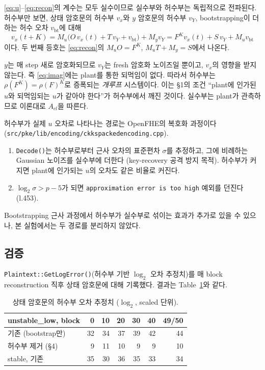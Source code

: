 \documentclass[11pt,a4paper]{article}
\begin{document}
\eqref{eq:u}--\eqref{eq:recon}의 계수는 모두 실수이므로 실수부와 허수부는 독립적으로 전파된다.
허수부만 보면, 상태 암호문의 허수부 $v_x$와 $y$ 암호문의 허수부 $v_Y$, bootstrapping이 더하는 허수 오차 $v_{\mathrm{bt}}$에 대해
\begin{equation}
v_x(t+K)=M_u\bigl(O\,v_x(t)+T\,v_Y+v_{\mathrm{bt}}\bigr)+M_y v_Y
        = F^K v_x(t)+S\,v_Y+M_u v_{\mathrm{bt}}
\label{eq:imag}
\end{equation}
이다. 두 번째 등호는 \eqref{eq:recon}의 $M_uO=F^K$, $M_uT+M_y=S$에서 나온다.

$y$는 매 step 새로 암호화되므로 $v_Y$는 fresh 암호화 노이즈일 뿐이고, $v_x$의 영향을 받지 않는다.
즉 \eqref{eq:imag}에는 plant를 통한 되먹임이 없다.
따라서 허수부는 $\rho(F^K)=\rho(F)^K$로 증폭되는 \emph{개루프} 시스템이다.
이는 \S1의 조건 ``plant에 인가된 $u$와 되먹임되는 $u$가 같아야 한다''가 허수부에서 깨진 것이다.
실수부는 plant가 관측하므로 이론대로 $A_{cl}$을 따른다.

허수부가 실제 $u$ 오차로 나타나는 경로는 OpenFHE의 복호화 과정이다
(\texttt{src/pke/lib/encoding/ckkspackedencoding.cpp}).
\begin{enumerate}
\item \texttt{Decode()}는 허수부로부터 근사 오차의 표준편차 $\sigma$를 추정하고, 그에 비례하는 Gaussian 노이즈를 실수부에 더한다 (key-recovery 공격 방지 목적).
      허수부가 커지면 plant에 인가되는 $u$의 오차도 같은 비율로 커진다.
\item $\log_2\sigma>p-5$가 되면 \texttt{approximation error is too high} 예외를 던진다 (l.453).
\end{enumerate}
Bootstrapping 근사 과정에서 허수부가 실수부로 섞이는 효과가 추가로 있을 수 있으나, 본 실험에서는 두 경로를 분리하지 않았다.

\subsection*{검증}
\texttt{Plaintext::GetLogError()}(허수부 기반 $\log_2$ 오차 추정치)를 매 block reconstruction 직후 상태 암호문에 대해 기록했다.
결과는 Table~\ref{tab:imag}와 같다.

\begin{table}[h]
\centering
\begin{tabular}{lrrrrrr}
\toprule
unstable\_low, block & 0 & 10 & 20 & 30 & 40 & 49/50 \\
\midrule
기존 (bootstrap만)      & 32 & 34 & 37 & 39 & 42 & 44 \\
허수부 제거 (\S4)        &  9 & 11 & 10 &  9 &  9 & 10 \\
\midrule
stable, 기존            & 35 & 30 & 36 & 35 & 33 & 34 \\
\bottomrule
\end{tabular}
\caption{상태 암호문의 허수부 오차 추정치 ($\log_2$, scaled 단위).}
\label{tab:imag}
\end{table}
\end{document}
